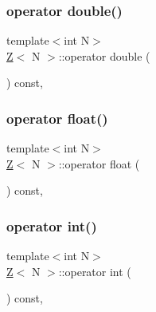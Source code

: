 \mbox{\label{classZ_a819290a913ce32272c6cdb7407846057}} 
\subsubsection{\texorpdfstring{operator double()}{operator double()}}
{\footnotesize\ttfamily template$<$int N$>$ \\
\hyperlink{classZ}{Z}$<$ N $>$\+::operator double (\begin{DoxyParamCaption}{ }\end{DoxyParamCaption}) const\hspace{0.3cm}{\ttfamily [inline]}, {\ttfamily [explicit]}}

\mbox{\label{classZ_a9bb3636d1ffd75dc1a221251f71d4781}} 
\subsubsection{\texorpdfstring{operator float()}{operator float()}}
{\footnotesize\ttfamily template$<$int N$>$ \\
\hyperlink{classZ}{Z}$<$ N $>$\+::operator float (\begin{DoxyParamCaption}{ }\end{DoxyParamCaption}) const\hspace{0.3cm}{\ttfamily [inline]}, {\ttfamily [explicit]}}

\mbox{\label{classZ_af687c6f9e1dc94110596c3552351d257}} 
\subsubsection{\texorpdfstring{operator int()}{operator int()}}
{\footnotesize\ttfamily template$<$int N$>$ \\
\hyperlink{classZ}{Z}$<$ N $>$\+::operator int (\begin{DoxyParamCaption}{ }\end{DoxyParamCaption}) const\hspace{0.3cm}{\ttfamily [inline]}, {\ttfamily [explicit]}}

\mbox{\label{classZ_ab21d99c84819bcbc6de88489a5375be4}} 
